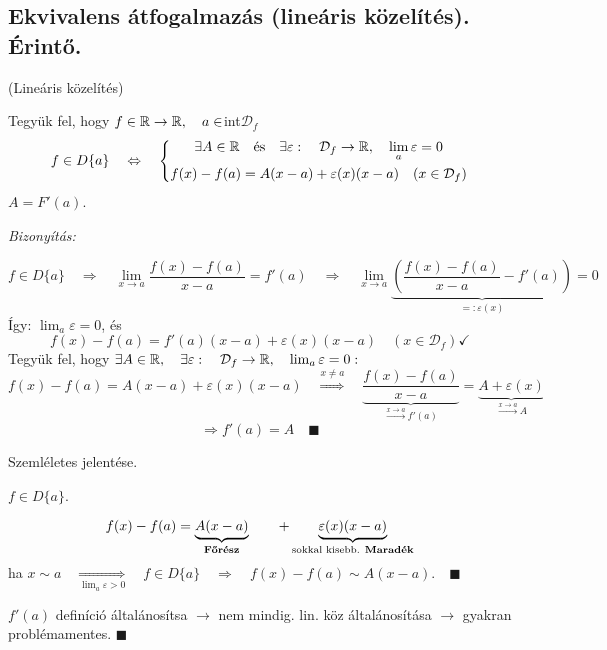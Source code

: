 \documentclass[a4paper,11.5pt]{article}
\begin{document}
	\subsection{Ekvivalens átfogalmazás (lineáris közelítés). Érintő.}
	\begin{theorem}
		(Lineáris közelítés)
		
		Tegyük fel, hogy $f\in\mathbb{R}\to\mathbb{R},\quad a\in$int$\mathcal{D}_f$
		\[ f\in D\{a\}\quad \Leftrightarrow\quad 
		\left\{\begin{gathered}
		\exists A\in\mathbb{R}\quad \text{és}\quad \exists \varepsilon:\quad \mathcal{D}_f\to\mathbb{R},\quad \lim_a\varepsilon=0\\
		f(x)-f(a)=A(x-a)+\varepsilon(x)(x-a)\quad (x\in\mathcal{D}_f)
		\end{gathered}\right. \]
		$A=F'(a)$.
		\medskip
		
		\textit{Bizonyítás:}
		
		\fbox{$\Rightarrow$}
		\[ f\in D\{a\}\quad \Rightarrow\quad \lim_{x\to a}\frac{f(x)-f(a)}{x-a}=f'(a)\quad \Rightarrow\quad \lim_{x\to a}\underbrace{\left(\frac{f(x)-f(a)}{x-a}-f'(a)\right)}_{=:\varepsilon(x)}=0 \]
		Így: \quad $\lim_a\varepsilon=0$, és 
		\[f(x)-f(a)=f'(a)(x-a)+\varepsilon(x)(x-a)\quad (x\in\mathcal{D}_f)\checkmark  \]
		\fbox{$\Leftarrow$} Tegyük fel, hogy $\exists A\in\mathbb{R},\quad \exists \varepsilon:\quad \mathcal{D}_f\to\mathbb{R},\quad \lim_a\varepsilon=0:$
		\[ f(x)-f(a)=A(x-a)+\varepsilon(x)(x-a)\quad \overset{x\not=a}{\Rightarrow}\quad \underbrace{\frac{f(x)-f(a)}{x-a}}_{\overset{x\to a}{\longrightarrow}f'(a)}=\underbrace{A+\varepsilon(x)}_{\overset{x\to a}{\longrightarrow}A} \]
		\[ \Rightarrow f'(a)=A\quad \blacksquare \]
	\end{theorem}
	\begin{note}
		Szemléletes jelentése.
		
		$f\in D\{a\}$.
		\begin{figure}[H]
			\centering
			\caption{}\label{}
		\end{figure}
		\[ f(x)-f(a)=\underbrace{A(x-a)}_{\text{\textbf{Főrész}}}\quad \quad +\underbrace{\varepsilon(x)(x-a)}_{\text{sokkal kisebb. \textbf{Maradék}}} \]
		ha $x\sim a\quad \underset{\lim_a\varepsilon>0}{\Rightarrow}\quad f\in D\{a\}\quad \Rightarrow\quad f(x)-f(a)\sim A(x-a).\quad \blacksquare$ 
	\end{note}
	\begin{note}
		$f'(a)$ definíció általánosítsa $\to$ nem mindig.
		lin. köz általánosítása $\to$ gyakran problémamentes. $\blacksquare$
	\end{note}
\end{document}
